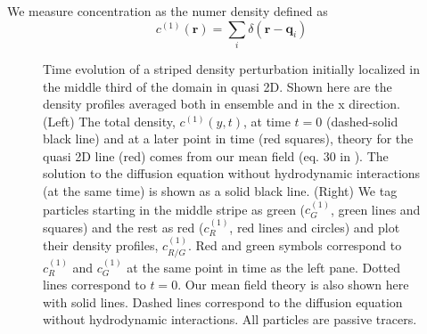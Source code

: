 \documentclass[ twoside,openright,titlepage,numbers=noenddot,%
headinclude,footinclude,cleardoublepage=empty,abstract=on,
BCOR=5mm,paper=a4,fontsize=11pt, dvipsnames
]{scrreprt}
\renewcommand{\vec}[1]{\bm{#1}}
\newcommand{\ppos}{q}
\newcommand{\fpos}{r}
\begin{document}
We measure concentration as the numer density defined as
\begin{equation}
  c^{(1)}(\vec{\fpos}) = \sum_i\delta(\vec{\fpos}-\vec{\ppos}_i)
\end{equation}
\begin{figure}[H]
  \label{fig:q2Doverdens}
  \centering
  \caption{Time evolution of a striped density perturbation initially localized in the middle third of the domain in quasi 2D. Shown here are the density profiles averaged both in ensemble and in the x direction. (Left) The total density, $c^{(1)}(y, t)$, at time $t=0$ (dashed-solid black line) and at a later point in time (red squares), theory for the quasi 2D line (red) comes from our mean field (eq. 30 in \cite{Pelaez2018}). The solution to the diffusion equation without hydrodynamic interactions (at the same time) is shown as a solid black line. (Right) We tag particles starting in the middle stripe as green ($c^{(1)}_G$, green lines and squares) and the rest as red ($c^{(1)}_R$, red lines and circles) and plot their density profiles, $c^{(1)}_{R/G}$. Red and green symbols correspond to $c^{(1)}_R$ and $c^{(1)}_G$ at the same point in time as the left pane. Dotted lines correspond to $t=0$. Our mean field theory is also shown here with solid lines. Dashed lines correspond to the diffusion equation without hydrodynamic interactions. All particles are passive tracers.}
\end{figure}
\end{document}
